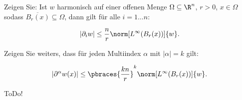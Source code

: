 
\begin{exercise}

Zeigen Sie:
Ist $w$ harmonisch auf einer offenen Menge $\Omega \subseteq \R^n$, $r > 0$, $x \in \Omega$ sodass $\overline{B_r(x)} \subseteq \Omega$, dann gilt für alle $i = 1 \dots n:$

\begin{align*}
    |\partial_i w|
    \leq
    \frac{n}{r}
    \norm[L^\infty(B_r(x))]{w}.
\end{align*}

Zeigen Sie weiters, dass für jeden Multiindex $\alpha$ mit $|\alpha| = k$ gilt:

\begin{align*}
    |\partial^\alpha w(x)|
    \leq
    \pbraces
    {
        \frac{kn}{r}
    }^k
    \norm[L^\infty(B_r(x))]{w}.
\end{align*}

\end{exercise}


\begin{solution}

ToDo!

\end{solution}

